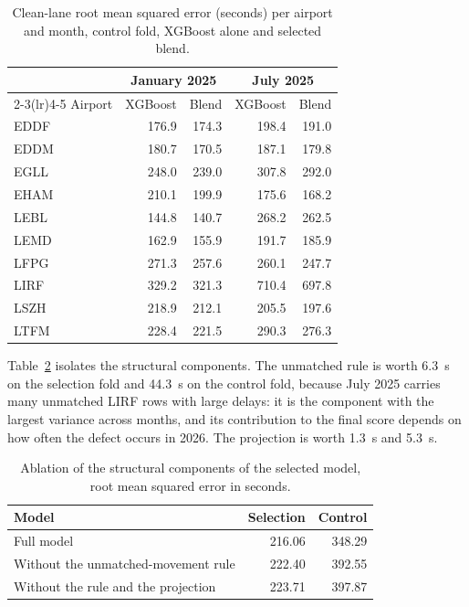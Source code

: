 \documentclass[11pt,a4paper]{article}
\begin{document}
\begin{table}[t]
\centering
\caption{Clean-lane root mean squared error (seconds) per airport and month,
control fold, XGBoost alone and selected blend.}
\label{tab:airports}
\begin{tabular}{lrrrr}
\toprule
& \multicolumn{2}{c}{January 2025} & \multicolumn{2}{c}{July 2025} \\
\cmidrule(lr){2-3}\cmidrule(lr){4-5}
Airport & XGBoost & Blend & XGBoost & Blend \\
\midrule
EDDF & 176.9 & 174.3 & 198.4 & 191.0 \\
EDDM & 180.7 & 170.5 & 187.1 & 179.8 \\
EGLL & 248.0 & 239.0 & 307.8 & 292.0 \\
EHAM & 210.1 & 199.9 & 175.6 & 168.2 \\
LEBL & 144.8 & 140.7 & 268.2 & 262.5 \\
LEMD & 162.9 & 155.9 & 191.7 & 185.9 \\
LFPG & 271.3 & 257.6 & 260.1 & 247.7 \\
LIRF & 329.2 & 321.3 & 710.4 & 697.8 \\
LSZH & 218.9 & 212.1 & 205.5 & 197.6 \\
LTFM & 228.4 & 221.5 & 290.3 & 276.3 \\
\bottomrule
\end{tabular}
\end{table}

Table~\ref{tab:ablation} isolates the structural components. The unmatched
rule is worth \SI{6.3}{\second} on the selection fold and \SI{44.3}{\second}
on the control fold, because July 2025 carries many unmatched LIRF rows with
large delays: it is the component with the largest variance across months, and
its contribution to the final score depends on how often the defect occurs in
2026. The projection is worth \SI{1.3}{\second} and \SI{5.3}{\second}.

\begin{table}[t]
\centering
\caption{Ablation of the structural components of the selected model, root
mean squared error in seconds.}
\label{tab:ablation}
\begin{tabular}{lrr}
\toprule
Model & Selection & Control \\
\midrule
Full model & 216.06 & 348.29 \\
Without the unmatched-movement rule & 222.40 & 392.55 \\
Without the rule and the projection & 223.71 & 397.87 \\
\bottomrule
\end{tabular}
\end{table}
\end{document}
